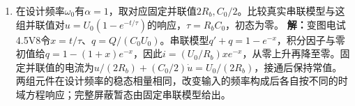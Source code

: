 \documentclass[UTF8,fontset=fandol,a4paper,11pt]{ctexart}
\begin{document}
\begin{enumerate}
\item 在设计频率$\omega_0$有$\alpha=1$，取对应固定并联值$2R_b,C_0/2$。比较真实串联模型与这组并联值对$u=U_0(1-e^{-t/\tau})$的响应，$\tau=R_bC_0$，初态为零。
\textbf{解：}变图电试4.5V8令$x=t/\tau$、$q=Q/(C_0U_0)$。串联模型$q'+q=1-e^{-x}$，积分因子与零初值给$q=1-(1+x)e^{-x}$，因此$i=(U_0/R_b)xe^{-x}$，从零上升再降至零。固定并联值的电流为$u/(2R_b)+(C_0/2)\dot u=U_0/(2R_b)$，接通后保持常值。两组元件在设计频率的稳态相量相同，改变输入的频率构成后各自按不同的时域方程响应；完整屏蔽暂态由固定串联模型给出。
\begin{center}\begin{minipage}{.98\linewidth}\centering
{}
\end{minipage}
\end{center}
\end{enumerate}
\end{document}
